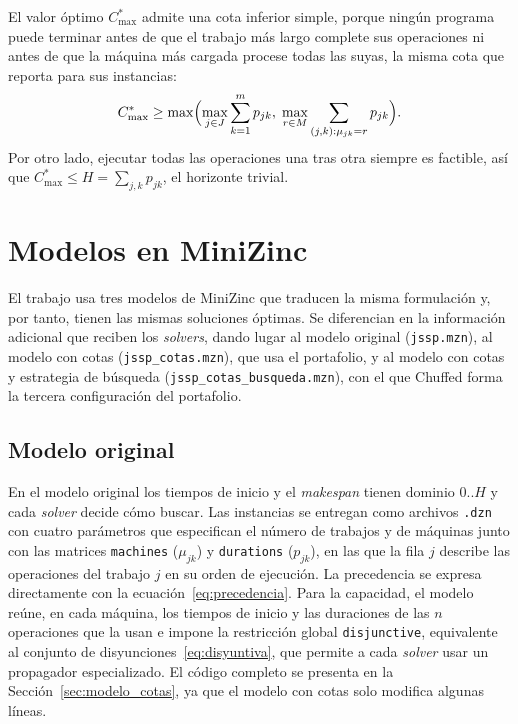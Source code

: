 El valor óptimo $C^{*}_{\max}$ admite una cota inferior simple, porque ningún
programa puede terminar antes de que el trabajo más largo complete sus
operaciones ni antes de que la máquina más cargada procese todas las suyas,
la misma cota que \citet{taillard1993} reporta para sus instancias:
\begin{equation}
  C^{*}_{\max} \ge \max\Bigl( \max_{j \in J} \sum_{k=1}^{m} p_{jk},\;
  \max_{r \in M} \sum_{(j,k) : \mu_{jk} = r} p_{jk} \Bigr).
  \label{eq:cota_inferior}
\end{equation}
Por otro lado, ejecutar todas las operaciones una tras otra siempre es
factible, así que $C^{*}_{\max} \le H = \sum_{j,k} p_{jk}$, el horizonte
trivial.

\section{Modelos en MiniZinc}
\label{sec:modelo_minizinc}

El trabajo usa tres modelos de MiniZinc que traducen la misma formulación y,
por tanto, tienen las mismas soluciones óptimas. Se diferencian en la
información adicional que reciben los \textit{solvers}, dando lugar al modelo
original (\texttt{jssp.mzn}), al modelo con cotas (\texttt{jssp\_cotas.mzn}),
que usa el portafolio, y al modelo con cotas y estrategia de búsqueda
(\texttt{jssp\_\allowbreak cotas\_\allowbreak busqueda.mzn}), con el que Chuffed
forma la tercera configuración del portafolio.

\subsection{Modelo original}
\label{sec:modelo_original}

En el modelo original los tiempos de inicio y el \textit{makespan} tienen
dominio $0..H$ y cada \textit{solver} decide cómo buscar. Las instancias se
entregan como archivos \texttt{.dzn} con cuatro parámetros que especifican el
número de trabajos y de máquinas junto con las matrices \texttt{machines}
($\mu_{jk}$) y \texttt{durations} ($p_{jk}$), en las que la fila $j$ describe
las operaciones del trabajo $j$ en su orden de ejecución. La precedencia se
expresa directamente con la ecuación~\eqref{eq:precedencia}. Para la
capacidad, el modelo reúne, en cada máquina, los tiempos de inicio y las
duraciones de las $n$ operaciones que la usan e impone la restricción global
\texttt{disjunctive}, equivalente al conjunto de
disyunciones~\eqref{eq:disyuntiva}, que permite a cada \textit{solver} usar un
propagador especializado. El código completo se presenta en la
Sección~\ref{sec:modelo_cotas}, ya que el modelo con cotas solo modifica
algunas líneas.


